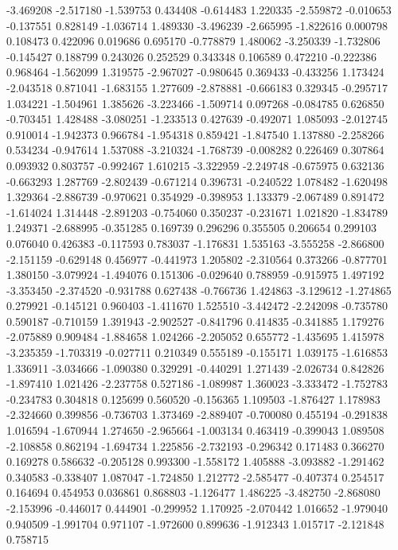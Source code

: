 -3.469208
-2.517180
-1.539753
0.434408
-0.614483
1.220335
-2.559872
-0.010653
-0.137551
0.828149
-1.036714
1.489330
-3.496239
-2.665995
-1.822616
0.000798
0.108473
0.422096
0.019686
0.695170
-0.778879
1.480062
-3.250339
-1.732806
-0.145427
0.188799
0.243026
0.252529
0.343348
0.106589
0.472210
-0.222386
0.968464
-1.562099
1.319575
-2.967027
-0.980645
0.369433
-0.433256
1.173424
-2.043518
0.871041
-1.683155
1.277609
-2.878881
-0.666183
0.329345
-0.295717
1.034221
-1.504961
1.385626
-3.223466
-1.509714
0.097268
-0.084785
0.626850
-0.703451
1.428488
-3.080251
-1.233513
0.427639
-0.492071
1.085093
-2.012745
0.910014
-1.942373
0.966784
-1.954318
0.859421
-1.847540
1.137880
-2.258266
0.534234
-0.947614
1.537088
-3.210324
-1.768739
-0.008282
0.226469
0.307864
0.093932
0.803757
-0.992467
1.610215
-3.322959
-2.249748
-0.675975
0.632136
-0.663293
1.287769
-2.802439
-0.671214
0.396731
-0.240522
1.078482
-1.620498
1.329364
-2.886739
-0.970621
0.354929
-0.398953
1.133379
-2.067489
0.891472
-1.614024
1.314448
-2.891203
-0.754060
0.350237
-0.231671
1.021820
-1.834789
1.249371
-2.688995
-0.351285
0.169739
0.296296
0.355505
0.206654
0.299103
0.076040
0.426383
-0.117593
0.783037
-1.176831
1.535163
-3.555258
-2.866800
-2.151159
-0.629148
0.456977
-0.441973
1.205802
-2.310564
0.373266
-0.877701
1.380150
-3.079924
-1.494076
0.151306
-0.029640
0.788959
-0.915975
1.497192
-3.353450
-2.374520
-0.931788
0.627438
-0.766736
1.424863
-3.129612
-1.274865
0.279921
-0.145121
0.960403
-1.411670
1.525510
-3.442472
-2.242098
-0.735780
0.590187
-0.710159
1.391943
-2.902527
-0.841796
0.414835
-0.341885
1.179276
-2.075889
0.909484
-1.884658
1.024266
-2.205052
0.655772
-1.435695
1.415978
-3.235359
-1.703319
-0.027711
0.210349
0.555189
-0.155171
1.039175
-1.616853
1.336911
-3.034666
-1.090380
0.329291
-0.440291
1.271439
-2.026734
0.842826
-1.897410
1.021426
-2.237758
0.527186
-1.089987
1.360023
-3.333472
-1.752783
-0.234783
0.304818
0.125699
0.560520
-0.156365
1.109503
-1.876427
1.178983
-2.324660
0.399856
-0.736703
1.373469
-2.889407
-0.700080
0.455194
-0.291838
1.016594
-1.670944
1.274650
-2.965664
-1.003134
0.463419
-0.399043
1.089508
-2.108858
0.862194
-1.694734
1.225856
-2.732193
-0.296342
0.171483
0.366270
0.169278
0.586632
-0.205128
0.993300
-1.558172
1.405888
-3.093882
-1.291462
0.340583
-0.338407
1.087047
-1.724850
1.212772
-2.585477
-0.407374
0.254517
0.164694
0.454953
0.036861
0.868803
-1.126477
1.486225
-3.482750
-2.868080
-2.153996
-0.446017
0.444901
-0.299952
1.170925
-2.070442
1.016652
-1.979040
0.940509
-1.991704
0.971107
-1.972600
0.899636
-1.912343
1.015717
-2.121848
0.758715
